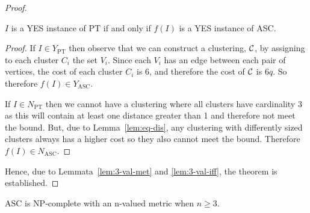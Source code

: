 \begin{proof}
  \begin{lem}
    \label{lem:3-val-iff}
    $I$ is a YES instance of PT if and only if $f(I)$ is a YES instance of ASC.
  \end{lem}

  \begin{proof}
    If $I \in Y_{\text{PT}}$ then observe that we can construct a clustering,
    $\mathcal{C}$, by assigning to each cluster $C_i$ the set $V_i$.  Since each
    $V_i$ has an edge between each pair of vertices, the cost of each cluster
    $C_i$ is $6$, and therefore the cost of $\mathcal{C}$ is $6q$.  So therefore
    $f(I) \in Y_{\text{ASC}}$.

    If $I \in N_{\text{PT}}$ then we cannot have a clustering where all
    clusters have cardinality $3$ as this will contain at least one distance
    greater than 1 and therefore not meet the bound.  But, due to
    Lemma~\ref{lem:eq-dis}, any clustering with differently sized clusters
    always has a higher cost so they also cannot meet the bound.  Therefore
    $f(I) \in N_{\text{ASC}}$.
  \end{proof}

  Hence, due to Lemmata~\ref{lem:3-val-met} and \ref{lem:3-val-iff}, the
  theorem is established.

\end{proof}

\begin{thm}
  \label{thm:asc-np-complete-n-val}
  ASC is NP-complete with an n-valued metric when $n \geq 3$.
\end{thm}

